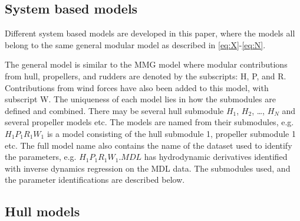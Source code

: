\subsection{System based models}\label{sec:models}
Different system based models are developed in this paper, where the models all belong to the same general modular model as described in \autoref{eq:X}-\autoref{eq:N}.



The general model is similar to the MMG model \citep{yasukawa_introduction_2015} where modular contributions from hull, propellers, and rudders are denoted by the subscripts: H, P, and R. Contributions from wind forces have also been added to this model, with subscript W. The uniqueness of each model lies in how the submodules are defined and combined. There may be several hull submodule $H_1$, $H_2$, …, $H_N$ and several propeller models etc. The models are named from their submodules, e.g. $H_1P_1R_1W_1$ is a model consisting of the hull submodule 1, propeller submodule 1 etc. The full model name also contains the name of the dataset used to identify the parameters, e.g. $H_1P_1R_1W_1.MDL$ has hydrodynamic derivatives identified with inverse dynamics regression on the MDL data. The submodules used, and the parameter identifications are described below.
\subsection{Hull models}\label{sec:hull_models}

